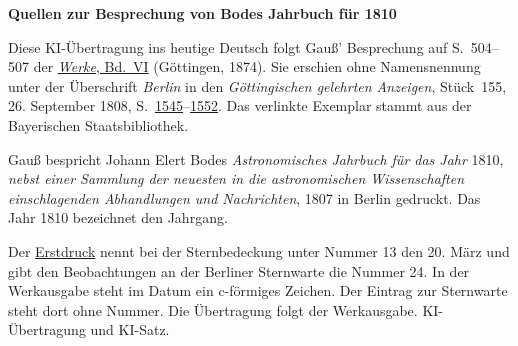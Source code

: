 \clearpage\thispagestyle{empty}
\begin{center}\textbf{Quellen zur Besprechung von Bodes Jahrbuch für 1810}\end{center}
\noindent Diese KI-Übertragung ins heutige Deutsch folgt Gauß’ Besprechung auf S.~504--507 der \href{https://gdz.sub.uni-goettingen.de/id/PPN236007467}{\textit{Werke}, Bd.~VI} (Göttingen, 1874). Sie erschien ohne Namensnennung unter der Überschrift \emph{Berlin} in den \textit{Göttingischen gelehrten Anzeigen}, Stück~155, 26. September 1808, S.~\href{https://api.digitale-sammlungen.de/iiif/image/v2/bsb10538674_00515/full/1800,/0/default.jpg}{1545}--\href{https://api.digitale-sammlungen.de/iiif/image/v2/bsb10538674_00522/full/1800,/0/default.jpg}{1552}. Das verlinkte Exemplar stammt aus der Bayerischen Staatsbibliothek.
\par\smallskip\noindent Gauß bespricht Johann Elert Bodes \emph{Astronomisches Jahrbuch für das Jahr} 1810, \emph{nebst einer Sammlung der neuesten in die astronomischen Wissenschaften einschlagenden Abhandlungen und Nachrichten}, 1807 in Berlin gedruckt. Das Jahr 1810 bezeichnet den Jahrgang.
\par\smallskip\noindent Der \href{https://api.digitale-sammlungen.de/iiif/image/v2/bsb10538674_00521/full/1800,/0/default.jpg}{Erstdruck} nennt bei der Sternbedeckung unter Nummer 13 den 20. März und gibt den Beobachtungen an der Berliner Sternwarte die Nummer 24. In der Werkausgabe steht im Datum ein c-förmiges Zeichen. Der Eintrag zur Sternwarte steht dort ohne Nummer. Die Übertragung folgt der Werkausgabe. KI-Übertragung und KI-Satz.
\clearpage
